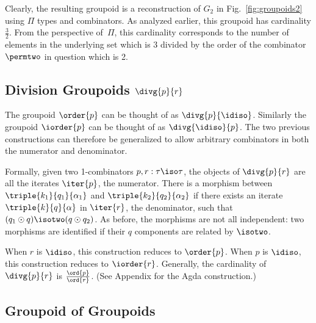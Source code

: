 Clearly, the resulting groupoid is a reconstruction of $G_2$ in
Fig.~\ref{fig:groupoids2} using $\Pi$ types and combinators. As analyzed
earlier, this groupoid has cardinality $\frac{3}{2}$. From the perspective
of~$\Pi$, this cardinality corresponds to the number of elements in the
underlying set which is $3$ divided by the order of the combinator $\permtwo$ in
question which is 2.

\subsection{Division Groupoids $\divg{p}{r}$}

The groupoid $\order{p}$ can be thought of as
$\divg{p}{\idiso}$. Similarly the groupoid $\iorder{p}$ can be thought
of as $\divg{\idiso}{p}$. The two previous constructions can therefore
be generalized to allow arbitrary combinators in both the numerator
and denominator.

Formally, given two 1-combinators $p, r : \tau\iso\tau$, the objects
of $\divg{p}{r}$ are all the iterates $\iter{p}$, the numerator. There
is a morphism between $\triple{k_1}{q_1}{\alpha_1}$ and
$\triple{k_2}{q_2}{\alpha_2}$ if there exists an iterate
$\triple{k}{q}{\alpha}$ in $\iter{r}$, the denominator, such that
$(q_1 \odot q) \isotwo (q \odot q_2)$. As before, the morphisms are
not all independent: two morphisms are identified if their $q$
components are related by $\isotwo$.

When $r$ is $\idiso$, this construction reduces to $\order{p}$. When $p$
is $\idiso$, this construction reduces to $\iorder{r}$. Generally, the
cardinality of $\divg{p}{r}$ is $\frac{\ord{p}}{\ord{r}}$. (See Appendix
for the Agda construction.)




\subsection{Groupoid of Groupoids}

